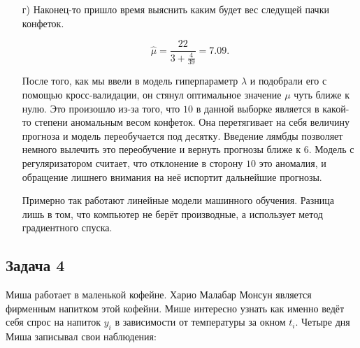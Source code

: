 \documentclass[12pt, a4paper, oneside]{article}
\begin{document}
{\begin{enumerate}
	Для удобства сделаем замену $t = \frac{4}{2 + \lambda}$ и будем минимизировать функцию 
	
		\[ 2(6 - 4t)^2 + (10 - 3t)^2 \to \min_t. \]	
		
	Возьмём производную, приравняем к нулу, получим, что $t = \frac{78}{41}$. Дело осталось за малым, восстановить $\lambda$:
	
\begin{equation*}
\begin{aligned}
&t = \frac{4}{2 + \lambda}, \\ 
&\frac{78}{41}  = \frac{4}{2 + \lambda}, \\
&39 \cdot(2 + \lambda) = 82,\\ 
&\lambda = \frac{82 - 78}{39} = \frac{4}{39}.\\
\end{aligned}
\end{equation*}	

Получается, что гиперпараметр $\lambda^{cv} = \frac{4}{39}$ будет минимизировать ошибку на валидации, и именно его имеет смысл использовать при построении прогнозов. 

\item[г)] Наконец-то пришло время выяснить каким будет вес следущей пачки конфеток. 

\[ \hat \mu = \frac{22}{3 + \frac{4}{39}} = 7.09.\]
	
После того, как мы ввели в модель гиперпараметр $\lambda$ и подобрали его с помощью кросс-валидации, он стянул оптимальное значение $\mu$ чуть ближе к нулю. Это произошло из-за того, что $10$ в данной выборке является в какой-то степени аномальным весом конфеток. Она перетягивает на себя величину прогноза и модель переобучается под десятку. Введение лямбды позволяет немного вылечить это переобучение и вернуть прогнозы ближе к $6$. Модель с регуляризатором считает, что отклонение в сторону $10$ это аномалия, и обращение лишнего внимания на неё испортит дальнейшие прогнозы. 

Примерно так работают линейные модели машинного обучения. Разница лишь в том, что компьютер не берёт производные, а использует метод градиентного спуска.
\end{enumerate}
}


\subsection*{Задача 4}

Миша работает в маленькой кофейне. Харио Малабар Монсун является фирменным напитком этой кофейни. Мише интересно узнать как именно ведёт себя спрос на напиток $y_i$ в зависимости от температуры за окном $t_i$. Четыре дня Миша записывал свои наблюдения: 
\end{document}
